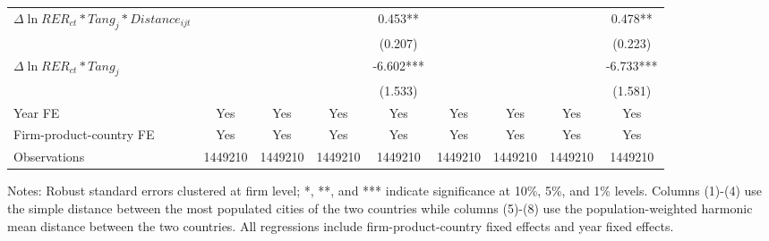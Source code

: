 \documentclass[12pt]{article}
\begin{document}
\begin{table}
{\begin{threeparttable}
\begin{tabular}{lcccccccc}
				$\Delta \ln RER_{ct}*Tang_{j}*Distance_{ijt}$ &       &       &       & 0.453**
				&       &       &       & 0.478**\\
				&       &       &       & (0.207) &       &       &       & (0.223)\\
				$\Delta \ln RER_{ct}*Tang_{j}$ &       &       &       & -6.602*** &       &       &       & -6.733***\\
				&       &       &       & (1.533) &       &       &       & (1.581)\\
				Year FE  & Yes   & Yes   & Yes   & Yes & Yes   & Yes   & Yes   & Yes\\
				Firm-product-country FE & Yes   & Yes   & Yes   & Yes & Yes   & Yes   & Yes   & Yes\\
				Observations & 1449210 & 1449210 & 1449210 & 1449210 & 1449210 & 1449210 & 1449210 & 1449210\\
				\bottomrule
			\end{tabular}
			\begin{tablenotes}
				\footnotesize
				\item[Notes:]Robust standard errors clustered at firm level; *, **, and *** indicate significance at 10\%, 5\%, and 1\% levels. Columns (1)-(4) use the simple distance between the most populated cities of the two countries while columns (5)-(8) use the population-weighted harmonic mean distance between the two countries. All regressions include firm-product-country fixed effects and year fixed effects.
			\end{tablenotes}
		\end{threeparttable}
	}
	\label{tab.source.distance}
\end{table}
\end{document}

